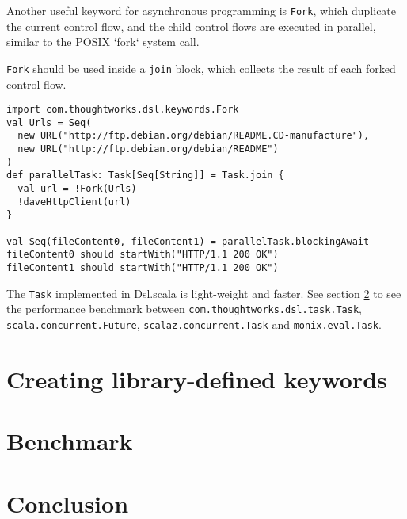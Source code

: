 Another useful keyword for asynchronous programming is \lstinline{Fork}, which duplicate the current control flow, and the child control flows are executed in parallel, similar to the POSIX `fork` system call.

\lstinline{Fork} should be used inside a \lstinline{join} block, which collects the result of each forked control flow.

\begin{lstlisting}[caption={Using Dave's http client in parallel},label={usingDaveHttpClientInParallel}]
import com.thoughtworks.dsl.keywords.Fork
val Urls = Seq(
  new URL("http://ftp.debian.org/debian/README.CD-manufacture"),
  new URL("http://ftp.debian.org/debian/README")
)
def parallelTask: Task[Seq[String]] = Task.join {
  val url = !Fork(Urls)
  !daveHttpClient(url)
}

val Seq(fileContent0, fileContent1) = parallelTask.blockingAwait
fileContent0 should startWith("HTTP/1.1 200 OK")
fileContent1 should startWith("HTTP/1.1 200 OK")
\end{lstlisting}

The \lstinline{Task} implemented in Dsl.scala is light-weight and faster. See section \ref{Benchmark} to see the performance benchmark between \lstinline{com.thoughtworks.dsl.task.Task}, \lstinline{scala.concurrent.Future}, \lstinline{scalaz.concurrent.Task} and \lstinline{monix.eval.Task}.



\section{Creating library-defined keywords}
\label{Creating library-defined keywords}





\section{Benchmark}
\label{Benchmark}
\section{Conclusion}
\label{conclusion}


\clearpage
\appendix

\printglossary

\begin{acks}
\end{acks}



